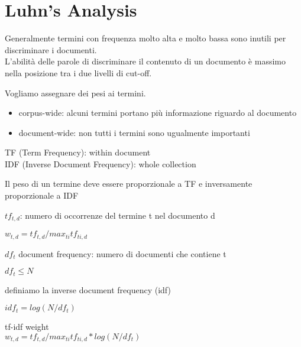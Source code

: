 \section{Luhn's Analysis}
Generalmente termini con frequenza molto alta e molto bassa sono inutili per discriminare i documenti.
\\


L'abilità delle parole di discriminare il contenuto di un documento è massimo nella posizione tra i due livelli di cut-off.


Vogliamo assegnare dei pesi ai termini.
\begin{itemize}
  \item corpus-wide: alcuni termini portano più informazione riguardo al documento
  \item document-wide: non tutti i termini sono ugualmente importanti
\end{itemize}

TF (Term Frequency): within document\\
IDF (Inverse Document Frequency): whole collection

Il peso di un termine deve essere proporzionale a TF e inversamente proporzionale a IDF

$tf_{t,d}$: numero di occorrenze del termine t nel documento d

$w_{t, d} = tf_{t,d} / max_{ti} tf_{ti,d}$

$df_t$ document frequency: numero di documenti che contiene t

$df_t \leq N$

definiamo la inverse document frequency (idf)

$idf_t = log(N/df_t)$

tf-idf weight\\
$w_{t, d} = tf_{t,d} / max_{ti} tf_{ti,d} * log(N/df_t)$
